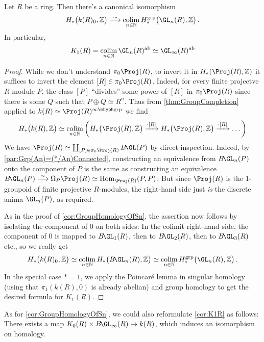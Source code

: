 \begin{cor}\label{cor:K1R}
	Let $R$ be a ring. Then there's a canonical isomorphism
	\begin{equation*}
		H_*\big(k(R)_0,\IZ\big)\isomorphism \colimit_{n\in\IN} H_*^\grp\big(\GL_n(R),\IZ\big)\,.
	\end{equation*}
	In particular,
	\begin{equation*}
		K_1(R)=\colimit_{n\in\IN}\GL_n(R)^\ab\simeq \GL_\infty(R)^\ab
	\end{equation*}
\end{cor}
\begin{proof}
	While we don't understand $\pi_0\Proj(R)$, to invert it in $H_*(\Proj(R),\IZ)$ it suffices to invert the element $[R]\in\pi_0\Proj(R)$. Indeed, for every finite projectve $R$-module $P$, the class $[P]$ \enquote{divides} some power of $[R]$  in $\pi_0\Proj(R)$ since there is some $Q$ such that $P\oplus Q\simeq R^n$. Thus from \cref{thm:GroupCompletion} applied to $k(R)\simeq \Proj(R)^\inftygrp$ we find
	\begin{align*}
		H_*\big(k(R),\IZ\big)\simeq \colimit_{n\in\IN}\left(H_*\big(\Proj(R),\IZ\big)\xrightarrow{\cdot [R]}H_*\big(\Proj(R),\IZ\big)\xrightarrow{\cdot [R]}\dotso\right)
	\end{align*}
	We have $\Proj(R)\simeq \coprod_{[P]\in \pi_0\Proj(R)}B\!\GL(P)$ by direct inspection. Indeed, by \cref{par:Grp(An)=(*/An)Connected}, constructing an equivalence from $B\!\GL_n(P)$ onto the component of $P$ is the same as constructing an equivalence $B\!\GL_n(P)\isomorphism \Omega_{P}\Proj(R)\simeq \Hom_{\Proj(R)}(P,P)$. But since $\Proj(R)$ is the $1$-groupoid of finite projective $R$-modules, the right-hand side just \emph{is} the discrete anima $\GL_n(P)$, as required.
	
	As in the proof of \cref{cor:GroupHomologyOfSn}, the assertion now follows by isolating the component of $0$ on both sides: In the colimit right-hand side, the component of $0$ is mapped to $B\!\GL_1(R)$, then to $B\!\GL_2(R)$, then to $B\!\GL_3(R)$ etc., so we really get 
	\begin{equation*}
		H_*\big(k(R)_0,\IZ\big)\simeq\colimit_{n\in\IN}H_*\big(B\!\GL_n(R),\IZ\big)\simeq \colimit_{n\in\IN}H_*^{\grp}\big(\GL_n(R),\IZ\big)\,.
	\end{equation*}
	In the special case $*=1$, we apply the Poincaré lemma in singular homology (using that $\pi_1(k(R),0)$ is already abelian) and group homology to get the desired formula for $K_1(R)$.
\end{proof}
\numpar*{\thesmallerdummy}As for \cref{cor:GroupHomologyOfSn}, we could also reformulate \cref{cor:K1R} as follows: There exists a map $K_0(R)\times B\!\GL_\infty(R)\morphism k(R)$, which induces an isomorphism on homology.

